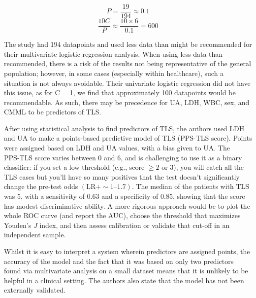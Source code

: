 \documentclass{article}
\begin{document}
\[P = \frac{19}{194} \approx 0.1 \]
\[\frac{10C}{P} \approx \frac{10 \times 6}{0.1} = 600\]

The study had 194 datapoints and used less data than might be recommended for their multivariate logistic regression analysis. When using less data than recommended, there is a risk of the results not being representative of the general population; however, in some cases (especially within healthcare), such a situation is not always avoidable. Their univariate logistic regression did not have this issue, as for C = 1, we find that approximately 100 datapoints would be recommendable. As such, there may be precedence for UA, LDH, WBC,  sex, and CMML to be predictors of TLS.

After using statistical analysis to find predictors of TLS, the authors used LDH and UA to make a points-based predictive model of TLS (PPS-TLS score). Points were assigned based on LDH and UA values, with a bias given to UA. The PPS‑TLS score varies between 0 and 6, and is challenging to use it as a binary classifier: if you set a low threshold (e.g., score \(\ge 2\) or 3), you will catch all the TLS cases but you’ll have so many positives that the test doesn’t significantly change the pre‑test odds \((\mathrm{LR}+ \sim1 \text{--}1.7)\). The median of the patients with TLS was 5, with a sensitivity of 0.63 and a specificity of 0.85, showing that the score has modest discriminative ability. 
A more rigorous approach would be to plot the whole ROC curve (and report the AUC), choose the threshold that maximizes Youden’s \(J\) index, and then assess calibration or validate that cut‑off in an independent sample.



Whilst it is easy to interpret a system wherein predictors are assigned points, the accuracy of the model and the fact that it was based on only two predictors found via multivariate analysis on a small dataset means that it is unlikely to be helpful in a clinical setting. The authors also state that the model has not been externally validated. 
\end{document}
